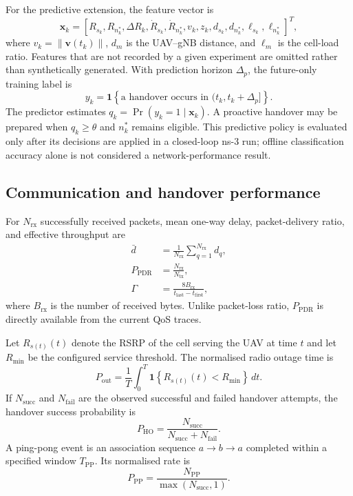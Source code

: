 For the predictive extension, the feature vector is
\begin{equation}
 \mathbf{x}_k = [R_{s_k},R_{n_k^*},\Delta R_k,
 \dot R_{s_k},\dot R_{n_k^*},v_k,z_k,
 d_{s_k},d_{n_k^*},\ell_{s_k},\ell_{n_k^*}]^T,
 \label{eq:features}
\end{equation}
where $v_k=\lVert\mathbf{v}(t_k)\rVert$, $d_m$ is the UAV--gNB distance, and
$\ell_m$ is the cell-load ratio. Features that are not recorded by a given
experiment are omitted rather than synthetically generated. With prediction
horizon $\Delta_p$, the future-only training label is
\begin{equation}
 y_k = \mathbf{1}\!\left\{\text{a handover occurs in }
 (t_k,t_k+\Delta_p]\right\}.
 \label{eq:future-label}
\end{equation}
The predictor estimates $q_k=\Pr(y_k=1\mid\mathbf{x}_k)$. A proactive
handover may be prepared when $q_k\geq\theta$ and $n_k^*$ remains eligible.
This predictive policy is evaluated only after its decisions are applied in a
closed-loop ns-3 run; offline classification accuracy alone is not considered
a network-performance result.

\subsection{Communication and handover performance}

For $N_{\mathrm{rx}}$ successfully received packets, mean one-way delay,
packet-delivery ratio, and effective throughput are
\begin{align}
 \bar d &= \frac{1}{N_{\mathrm{rx}}}
           \sum_{q=1}^{N_{\mathrm{rx}}} d_q, \\
 P_{\mathrm{PDR}} &= \frac{N_{\mathrm{rx}}}{N_{\mathrm{tx}}}, \\
 \Gamma &= \frac{8B_{\mathrm{rx}}}{t_{\mathrm{last}}-t_{\mathrm{first}}},
 \label{eq:communication-kpis}
\end{align}
where $B_{\mathrm{rx}}$ is the number of received bytes. Unlike packet-loss
ratio, $P_{\mathrm{PDR}}$ is directly available from the current QoS traces.

Let $R_{s(t)}(t)$ denote the RSRP of the cell serving the UAV at time $t$ and
let $R_{\min}$ be the configured service threshold. The normalised radio
outage time is
\begin{equation}
 P_{\mathrm{out}} = \frac{1}{T}\int_0^T
 \mathbf{1}\!\left\{R_{s(t)}(t)<R_{\min}\right\}\,dt.
 \label{eq:outage}
\end{equation}
If $N_{\mathrm{succ}}$ and $N_{\mathrm{fail}}$ are the observed successful
and failed handover attempts, the handover success probability is
\begin{equation}
 P_{\mathrm{HO}} = \frac{N_{\mathrm{succ}}}
 {N_{\mathrm{succ}}+N_{\mathrm{fail}}}.
 \label{eq:ho-success}
\end{equation}
A ping-pong event is an association sequence $a\!\rightarrow\!b\!\rightarrow\!a$
completed within a specified window $T_{\mathrm{PP}}$. Its normalised rate is
\begin{equation}
 P_{\mathrm{PP}} = \frac{N_{\mathrm{PP}}}{\max(N_{\mathrm{succ}},1)}.
 \label{eq:ping-pong}
\end{equation}

